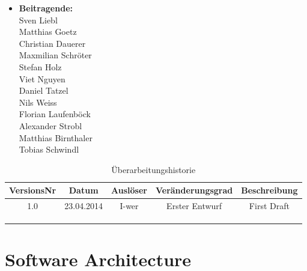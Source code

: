 \documentclass[10pt,a4paper]{scrartcl}
\begin{document}


\newpage
\begin{itemize}
\item[] \textbf{\large Beitragende:}\\
Sven Liebl\\
Matthias Goetz\\
Christian Dauerer\\
Maxmilian Schröter\\
Stefan Holz\\
Viet Nguyen\\
Daniel Tatzel\\
Nils Weiss\\
Florian Laufenböck\\
Alexander Strobl\\
Matthias Birnthaler\\
Tobias Schwindl
\end{itemize}

\bigskip

\begin{table}[!h]
 	\centering
	\begin{tabular}{|c|c|c|c||c|} 
	\hline
	\textbf{VersionsNr} &  \textbf{Datum} & \textbf{Auslöser} & \textbf{Veränderungsgrad} & \textbf{Beschreibung} \\
	\hline
	1.0 & 23.04.2014 & I-wer & Erster Entwurf & First Draft \\
	\hline
	\text{ } & \text{ } & \text{ } & \text{ } & \text{ } \\
	\hline
	\text{ } & \text{ } & \text{ } & \text{ } & \text{ } \\
	\hline
	\text{ } & \text{ } & \text{ } & \text{ } & \text{ } \\
	\hline
	\end{tabular}

\caption{Überarbeitungshistorie}
\end{table}

\newpage
\tableofcontents

\newpage
\section{Software Architecture}
\end{document}
